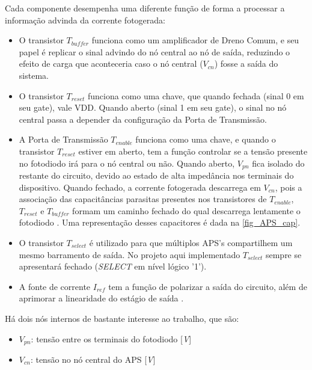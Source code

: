 Cada componente desempenha uma diferente função de forma a processar a informação advinda da corrente fotogerada:

\begin{itemize}

    \item O transistor $T_{buffer}$ funciona como um amplificador de Dreno Comum, e seu papel \'e replicar o sinal advindo do n\'o central ao n\'o de sa\'ida, reduzindo o efeito de carga que aconteceria caso o n\'o central ($V_{cn}$) fosse a saída do sistema.

    \item O transistor $T_{reset}$ funciona como uma chave, que quando fechada (sinal 0 em seu gate), vale VDD. Quando aberto (sinal 1 em seu gate), o sinal no n\'o central passa a depender da configuração da Porta de Transmissão.

    \item A Porta de Transmissão $T_{enable}$ funciona como uma chave, e quando o transistor $T_{reset}$ estiver em aberto, tem a função controlar se a tensão presente no fotodiodo ir\'a para o nó central ou não. Quando aberto, $V_{pn}$ fica isolado do restante do circuito, devido ao estado de alta imped\^ancia nos terminais do dispositivo. Quando fechado, a corrente fotogerada descarrega em $V_{cn}$, pois a associação das capacitâncias parasitas presentes nos transistores de $T_{enable}$, $T_{reset}$ e $T_{buffer}$ formam um caminho fechado do qual descarrega lentamente o fotodiodo \cite{LidianeCampos}. Uma representação desses capacitores \'e dada na \autoref{fig_APS_cap}.
    
    \item O transistor $T_{select}$ \'e utilizado para que m\'ultiplos APS's compartilhem um mesmo barramento de sa\'ida. No projeto aqui implementado $T_{select}$ sempre se apresentar\'a fechado (\textit{SELECT} em n\'ivel l\'ogico '1').
    
    \item A fonte de corrente \textit{$I_{ref}$} tem a função de polarizar a sa\'ida do circuito, além de aprimorar a linearidade do estágio de sa\'ida \cite{RazaviFundM}.

\end{itemize}

    H\'a dois n\'os internos de bastante interesse ao trabalho, que são:

\begin{itemize}
    \item \textit{$V_{pn}$}: tensão entre os terminais do fotodiodo [\textit{V}]
    \item \textit{$V_{cn}$}: tensão no n\'o central do APS [\textit{V}]
\end{itemize}

